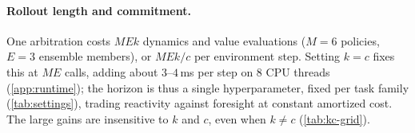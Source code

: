\documentclass{article}
\theoremstyle{plain}
\theoremstyle{definition}
\theoremstyle{plain}
\begin{document}

\paragraph{Rollout length and commitment.}
One arbitration costs $MEk$ dynamics and value evaluations ($M{=}6$ policies, $E{=}3$ ensemble members), or $MEk/c$ per environment step.
Setting $k{=}c$ fixes this at $ME$ calls, adding about $3$--$4$\,ms per step on 8 CPU threads (\cref{app:runtime}); the horizon is thus a single hyperparameter, fixed per task family (\cref{tab:settings}), trading reactivity against foresight at constant amortized cost.
The large gains are insensitive to $k$ and $c$, even when $k\neq c$ (\cref{tab:kc-grid}).
\end{document}
